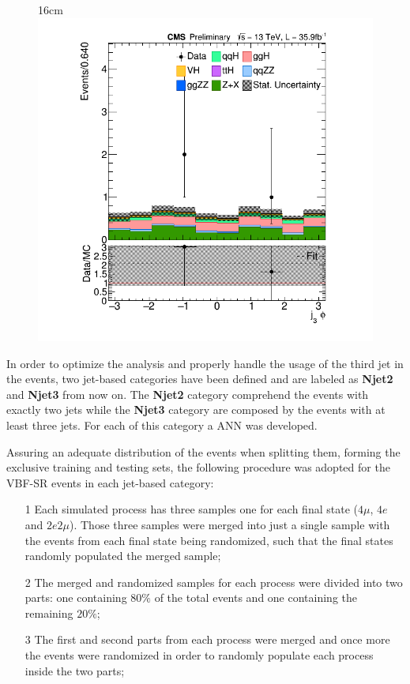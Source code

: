 \begin{figure}[hbtp]{16cm}
{		\includegraphics[scale=0.23,trim={2cm 1cm 2cm 1cm},clip]{ChapterAnalysis/figs/vbf_j3_phi}
	}
	\label{fig:ann_input_variables}
\end{figure}


In order to optimize the analysis and properly handle the usage of the third jet in the events, two jet-based categories have been defined and are labeled as \textbf{Njet2} and \textbf{Njet3} from now on. The \textbf{Njet2} category comprehend the events with exactly two jets while the \textbf{Njet3} category are composed by the events with at least three jets. For each of this category a ANN was developed.

Assuring an adequate distribution of the events when splitting them, forming the exclusive training and testing sets, the following procedure was adopted for the VBF-SR events in each jet-based category:
\begin{itemize}
	\item[1] Each simulated process has three samples one for each final state ($4\mu$, $4e$ and $2e2\mu$). Those three samples were merged into just a single sample with the events from each final state being randomized, such that the final states randomly populated the merged sample;
	\item[2] The merged and randomized samples for each process were divided into two parts: one containing $80\%$ of the total events and one containing the remaining $20\%$;
	\item[3] The first and second parts from each process were merged and once more the events were randomized in order to randomly populate each process inside the two parts;
\end{itemize}

